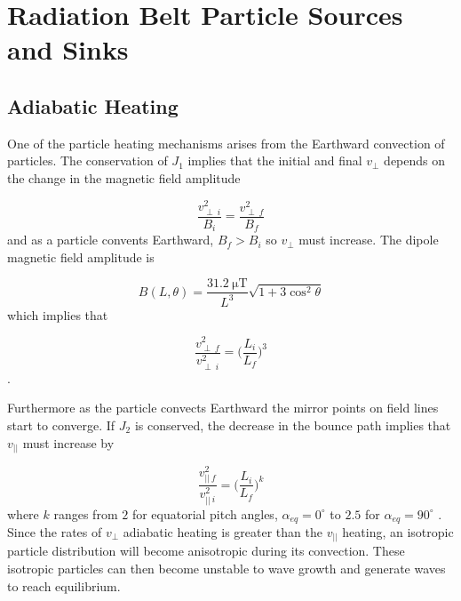 \section{Radiation Belt Particle Sources and Sinks}\label{Intro:sources_sinks}

\subsection{Adiabatic Heating}\label{Intro:adiabatic_heating}
One of the particle heating mechanisms arises from the Earthward convection of particles. The conservation of $J_1$ implies that the initial and final $v_\perp$ depends on the change in the magnetic field amplitude

\begin{equation}
\frac{v^2_{\perp \ i}}{B_i} = \frac{v^2_{\perp \ f}}{B_f}
\end{equation} and as a particle convents Earthward, $B_f > B_i$ so $v_\perp$ must increase. The dipole magnetic field amplitude is 

\begin{equation}
B(L, \theta) = \frac{31.2 \ \mathrm{\mu T}}{L^3}\sqrt{1 + 3 \cos^2 \theta}
\end{equation} which implies that 

\begin{equation}
\frac{v_{\perp \ f}^2}{v_{\perp \ i}^2} = \bigg( \frac{L_i}{L_f} \bigg)^3
\end{equation}.

Furthermore as the particle convects Earthward the mirror points on field lines start to converge. If $J_2$ is conserved, the decrease in the bounce path implies that $v_{||}$ must increase by 

\begin{equation}
\frac{v_{|| \ f}^2}{v_{|| \ i}^2} = \bigg( \frac{L_i}{L_f} \bigg)^k
\end{equation} where $k$ ranges from $2$ for equatorial pitch angles, $\alpha_{eq} = 0^\circ$ to $2.5$ for $\alpha_{eq} = 90^\circ$ \citep{Baumjohann1997}. Since the rates of $v_\perp$ adiabatic heating is greater than the $v_{||}$ heating, an isotropic particle distribution will become anisotropic during its convection. These isotropic particles can then become unstable to wave growth and generate waves to reach equilibrium.


